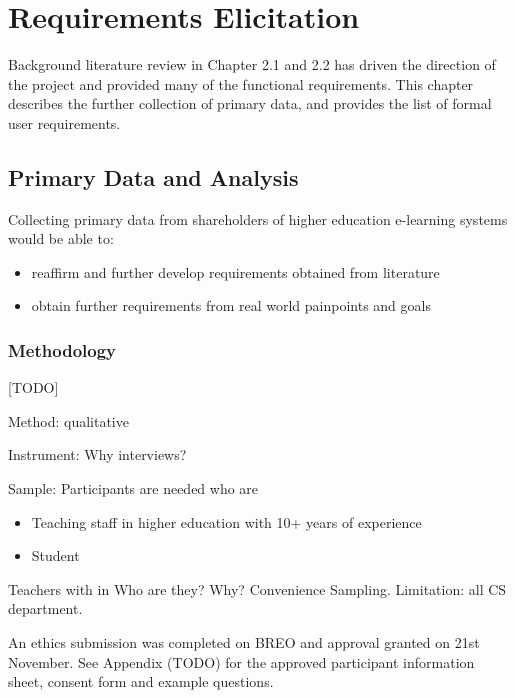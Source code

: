 \chapter{Requirements Elicitation}
\graphicspath{{Chapter4/Figs/Raster/}{Chapter4/Figs/}}

Background literature review in Chapter 2.1 and 2.2 has driven the direction of the project and 
provided many of the functional requirements. This chapter describes the further collection of primary 
data, and provides the list of formal user requirements.

\section{Primary Data and Analysis}
Collecting primary data from shareholders of higher education e-learning systems would be able to:
\begin{itemize}
    \item reaffirm and further develop requirements obtained from literature
    \item obtain further requirements from real world painpoints and goals
\end{itemize}

\subsection{Methodology}

[TODO]

Method: qualitative

Instrument: Why interviews?

Sample: Participants are needed who are 
\begin{itemize}
    \item Teaching staff in higher education with 10+ years of experience
    \item Student
\end{itemize}Teachers with  in Who are they? Why? Convenience Sampling. Limitation: all CS department.

An ethics submission was completed on BREO and approval granted on 21st November. 
See Appendix (TODO) for the approved participant information sheet, consent form and example questions.

